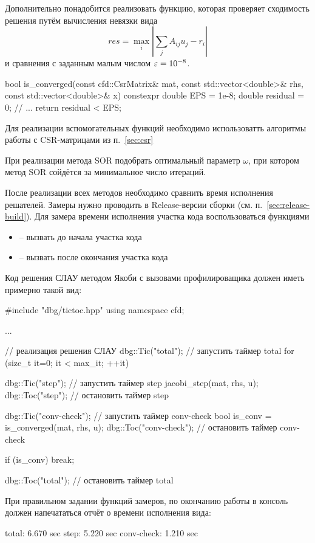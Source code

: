 Дополнительно понадобится реализовать функцию, которая проверяет сходимость решения
путём вычисления невязки вида
\begin{equation*}
res = \max_i{\left| \sum_{j}A_{ij} u_j - r_i \right|}
\end{equation*}
и сравнения с заданным малым числом $\varepsilon=10^{-8}$.
\begin{cppcode}
bool is_converged(const cfd::CsrMatrix& mat, const std::vector<double>& rhs, const std::vector<double>& x){
	constexpr double EPS = 1e-8;
	double residual = 0;
	// ...
	return residual < EPS;
}
\end{cppcode}

Для реализации вспомогательных функций необходимо
использоватть алгоритмы работы с CSR-матрицами из п.~\ref{sec:csr}

При реализации метода SOR подобрать оптимальный параметр $\omega$,
при котором метод SOR сойдётся за минимальное число итераций.

После реализации всех методов необходимо
сравнить время исполнения решателей. Замеры нужно проводить в Release-версии сборки (см. п.~\ref{sec:release-build}).
Для замера времени исполнения участка кода воспользоваться функциями
\begin{itemize}
\item {} -- вызвать до начала участка кода
\item {} -- вызвать после окончания участка кода
\end{itemize}

Код решения СЛАУ методом Якоби с вызовами профилироващика
должен иметь примерно такой вид:
\begin{cppcode}
#include "dbg/tictoc.hpp"
using namespace cfd;

...

// реализация решения СЛАУ
dbg::Tic("total");  // запустить таймер total
for (size_t it=0; it < max_it; ++it){
	dbg::Tic("step");  // запустить таймер step
	jacobi_step(mat, rhs, u);
	dbg::Toc("step");  // остановить таймер step

	dbg::Tic("conv-check");  // запустить таймер conv-check
	bool is_conv = is_converged(mat, rhs, u);
	dbg::Toc("conv-check");  // остановить таймер conv-check

	if (is_conv) break;
}
dbg::Toc("total");  // остановить таймер total
\end{cppcode}

При правильном задании функций замеров, по окончанию работы в консоль должен напечататься отчёт о времени исполнения вида:
\begin{shelloutput}
     total:  6.670 sec
      step:  5.220 sec
conv-check:  1.210 sec
\end{shelloutput}

